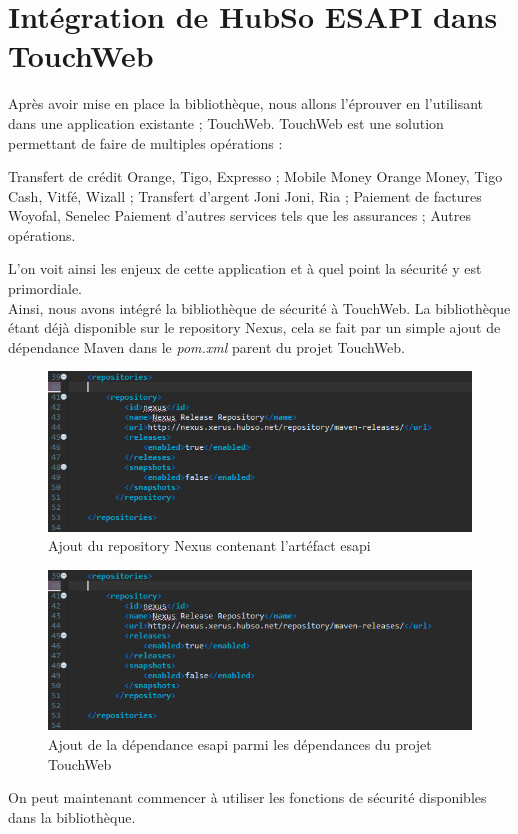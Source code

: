 \section{Intégration de HubSo ESAPI dans TouchWeb}
Après avoir mise en place la bibliothèque, nous allons l'éprouver en l'utilisant dans une application existante ; TouchWeb. TouchWeb est une solution permettant de faire de multiples opérations :
\begin{itemize}
	\itemcheck Transfert de crédit Orange, Tigo, Expresso ;
	\itemcheck Mobile Money Orange Money, Tigo Cash, Vitfé, Wizall ;
	\itemcheck Transfert d'argent Joni Joni, Ria ;
	\itemcheck Paiement de factures Woyofal, Senelec
	\itemcheck Paiement d'autres services tels que les assurances ;
	\itemcheck Autres opérations.
\end{itemize}
L'on voit ainsi les enjeux de cette application et à quel point la sécurité y est primordiale.\\
Ainsi, nous avons intégré la bibliothèque de sécurité à TouchWeb. La bibliothèque étant déjà disponible sur le repository Nexus, cela se fait par un simple ajout de dépendance Maven dans le \textit{pom.xml} parent du projet TouchWeb.
\begin{figure}[H]
	\centering
	\begin{minipage}{12cm}
		\centering
		\includegraphics[width=1\textwidth]{fig/nexus-repository.png}
	\end{minipage}
	\caption{Ajout du repository Nexus contenant l'artéfact esapi}
	\label{fig:vccdfs}
\end{figure}
\begin{figure}[H]
	\centering
	\begin{minipage}{12cm}
		\centering
		\includegraphics[width=1\textwidth]{fig/nexus-repository.png}
	\end{minipage}
	\caption{Ajout de la dépendance esapi parmi les dépendances du projet TouchWeb}
	\label{fig:vccdfs}
\end{figure}
On peut maintenant commencer à utiliser les fonctions de sécurité disponibles dans la bibliothèque.

